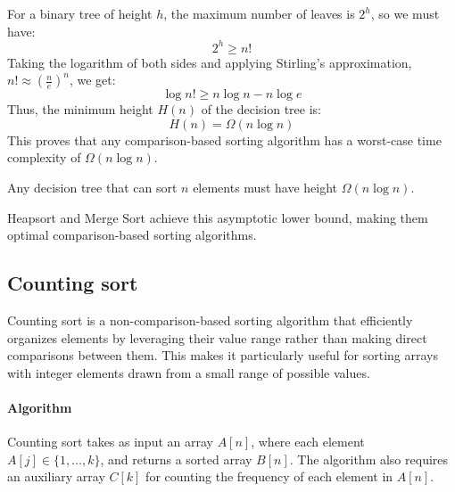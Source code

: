For a binary tree of height $h$, the maximum number of leaves is $2^h$, so we must have:
\[2^h\geq n!\]
Taking the logarithm of both sides and applying Stirling's approximation, $n!\approx\left(\frac{n}{e}\right)^n$, we get:
\[\log n!\geq n\log n-n\log e\]
Thus, the minimum height $H(n)$ of the decision tree is:
\[H(n)=\Omega(n\log n)\]
This proves that any comparison-based sorting algorithm has a worst-case time complexity of $\Omega(n\log n)$.
\begin{theorem}
    Any decision tree that can sort $n$ elements must have height $\Omega(n \log n)$.
\end{theorem}
\begin{corollary}
    Heapsort and Merge Sort achieve this asymptotic lower bound, making them optimal comparison-based sorting algorithms.
\end{corollary}

\subsection{Counting sort}
Counting sort is a non-comparison-based sorting algorithm that efficiently organizes elements by leveraging their value range rather than making direct comparisons between them.
This makes it particularly useful for sorting arrays with integer elements drawn from a small range of possible values.

\paragraph*{Algorithm}
Counting sort takes as input an array $A[n]$, where each element $A[j]\in\{1, \dots, k\}$, and returns a sorted array $B[n]$.
The algorithm also requires an auxiliary array $C[k]$ for counting the frequency of each element in $A[n]$. 

